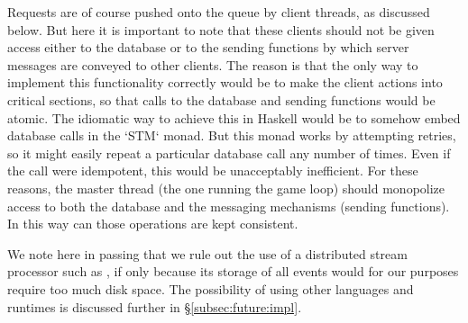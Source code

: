 Requests are of course pushed onto the queue by client threads, as discussed
below.
But here it is important to note that these clients should not be given
access either to the database or to the sending functions by which server
messages are conveyed to other clients.
The reason is that the only way to implement this functionality correctly
would be to make the client actions into critical sections, so that calls to
the database and sending functions would be atomic.
The idiomatic way to achieve this in Haskell
would be to somehow embed database calls in the `STM` monad.
But this monad works by attempting retries, so it might easily repeat a
particular database call any number of times.
Even if the call were idempotent, this would be unacceptably inefficient.
For these reasons, the master thread (the one running the game loop) should
monopolize access to both the database and the messaging mechanisms (sending
functions).
In this way can those operations are kept consistent.

We note here in passing that we rule out the use of a distributed stream
processor such as ,
if only because its storage of all events would
for our purposes require too much disk space.
The possibility of using other languages and runtimes is discussed further
in \S\ref{subsec:future:impl}.